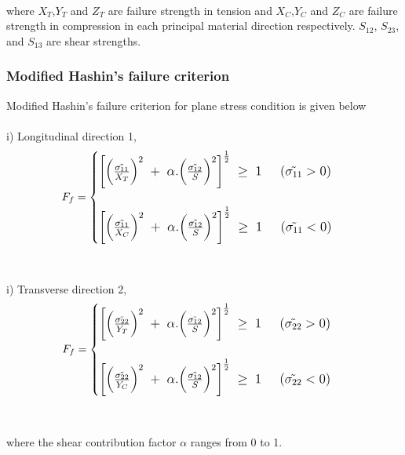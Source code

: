 \documentclass[a4paper,12pt]{extarticle}
\begin{document}
\\
\\
\\
where $X_{T}$,$ Y_{T} $ and $Z_{T}$ are failure strength in tension and $X_{C}$,$ Y_{C} $ and $Z_{C}$ are failure strength in compression in each principal material direction respectively. $S_{12}$, $S_{23}$, and $S_{13}$ are shear strengths.
\subsubsection{Modified Hashin's failure criterion }
\indent\indent\indent Modified Hashin's failure criterion for plane stress condition is given below
\\
\\
i) Longitudinal direction 1,
\\
\begin{equation}
\large{F_{f} =  
	\begin{cases}
	
		\left[ \Big(\frac{\tilde{\sigma_{11}}} {X_{T}}\Big)^{2} \; + \;\alpha . \Big(\frac{\tilde{\sigma_{12}}}{S}\Big)^{2}\right]^{\frac{1}{2}} \;  \geq  \; 1  \; \; \; \; \;  (\tilde{\sigma_{11}}  >  0)  \\
	\\
\left[ \Big(\frac{\tilde{\sigma_{11}}} {X_{C}}\Big)^{2} \; + \;\alpha . \Big(\frac{\tilde{\sigma_{12}}}{S}\Big)^{2}\right]^{\frac{1}{2}} \;  \geq  \; 1  \; \; \; \; \;  (\tilde{\sigma_{11}}  <  0)
	
	\end{cases}}
\end{equation}
\\
\\
i) Transverse direction 2,
\\
\begin{equation}
\large{F_{f} =  
	\begin{cases}
	
	\left[ 	\Big(\frac{\tilde{\sigma_{22}}} {Y_{T}}\Big)^{2} \; + \;\alpha . \Big(\frac{\tilde{\sigma_{12}}}{S}\Big)^{2} \right]^{\frac{1}{2}} \;  \geq  \; 1  \; \; \; \; \;  (\tilde{\sigma_{22}}  >  0)  \\
	\\
\left[ \Big(\frac{\tilde{\sigma_{22}}} {Y_{C}}\Big)^{2} \; + \;\alpha . \Big(\frac{\tilde{\sigma_{12}}}{S}\Big)^{2}\right]^{\frac{1}{2}} \;  \geq  \; 1  \; \; \; \; \;  (\tilde{\sigma_{22}}  <  0)
	
	\end{cases}}
\end{equation}
\\
\\
where the shear contribution factor $\alpha$ ranges from 0 to 1.
\newpage
\end{document}
